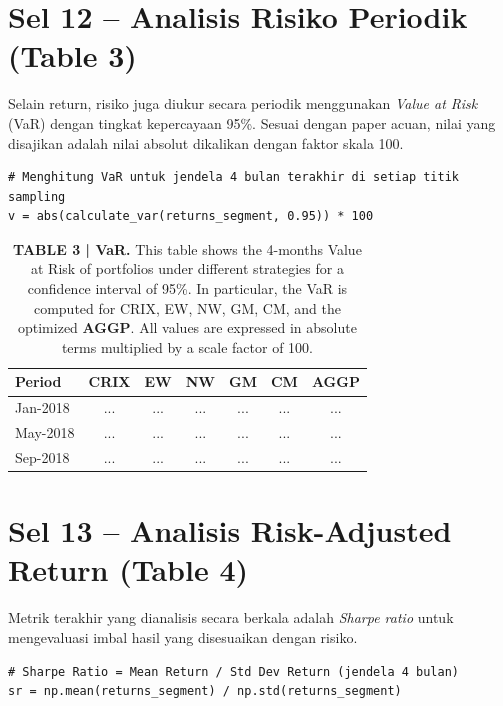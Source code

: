 \documentclass[12pt,a4paper]{article}
\begin{document}
\section{Sel 12 -- Analisis Risiko Periodik (Table 3)}
Selain return, risiko juga diukur secara periodik menggunakan \textit{Value at Risk} (VaR) dengan tingkat kepercayaan 95\%. Sesuai dengan paper acuan, nilai yang disajikan adalah nilai absolut dikalikan dengan faktor skala 100.

\begin{lstlisting}[caption={Kalkulasi VaR 95\% Periodik}]
# Menghitung VaR untuk jendela 4 bulan terakhir di setiap titik sampling
v = abs(calculate_var(returns_segment, 0.95)) * 100
\end{lstlisting}

\begin{table}[h]
    \centering
    \footnotesize
    \caption{\textbf{TABLE 3 | VaR.} This table shows the 4-months Value at Risk of portfolios under different strategies for a confidence interval of 95\%. In particular, the VaR is computed for CRIX, EW, NW, GM, CM, and the optimized \textbf{AGGP}. All values are expressed in absolute terms multiplied by a scale factor of 100.}
    \begin{tabular}{lcccccc}
        \toprule
        Period & CRIX & EW & NW & GM & CM & AGGP \\
        \midrule
        Jan-2018 & ... & ... & ... & ... & ... & ... \\
        May-2018 & ... & ... & ... & ... & ... & ... \\
        Sep-2018 & ... & ... & ... & ... & ... & ... \\
        \bottomrule
    \end{tabular}
\end{table}

\section{Sel 13 -- Analisis Risk-Adjusted Return (Table 4)}
Metrik terakhir yang dianalisis secara berkala adalah \textit{Sharpe ratio} untuk mengevaluasi imbal hasil yang disesuaikan dengan risiko.

\begin{lstlisting}[caption={Kalkulasi Sharpe Ratio Periodik}]
# Sharpe Ratio = Mean Return / Std Dev Return (jendela 4 bulan)
sr = np.mean(returns_segment) / np.std(returns_segment)
\end{lstlisting}
\end{document}
